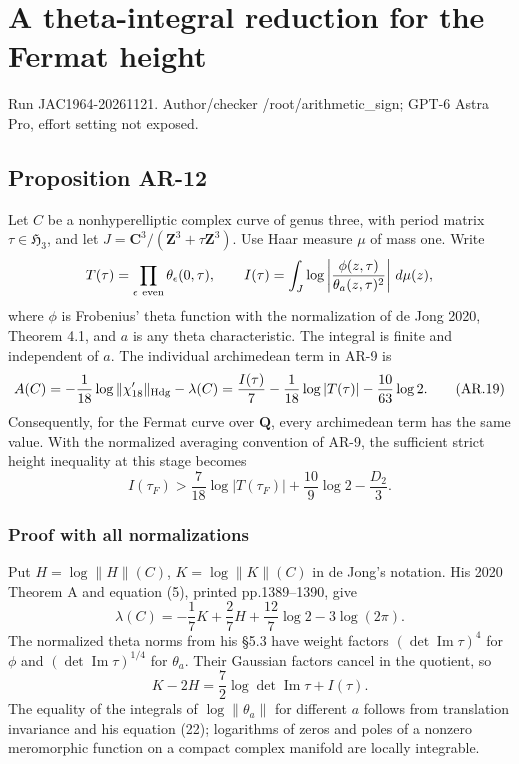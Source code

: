 \documentclass[11pt,a4paper]{article}
\begin{document}
\section{A theta-integral reduction for the Fermat
height}\label{a-theta-integral-reduction-for-the-fermat-height}

Run JAC1964-20261121. Author/checker /root/arithmetic\_sign; GPT-6 Astra
Pro, effort setting not exposed.

\subsection{Proposition AR-12}\label{proposition-ar-12}

Let \(C\) be a nonhyperelliptic complex curve of genus three, with
period matrix \(\tau\in\mathfrak H_3\), and let
\(J=\mathbf C^3/(\mathbf Z^3+\tau\mathbf Z^3)\). Use Haar measure
\(\mu\) of mass one. Write \[
T(\tau)=\prod_{\epsilon\ {\rm even}}\theta_\epsilon(0,\tau),
\qquad
I(\tau)=\int_J\log\left|
  \frac{\phi(z,\tau)}{\theta_a(z,\tau)^2}
\right|\,d\mu(z),
\] where \(\phi\) is Frobenius' theta function with the normalization of
de Jong 2020, Theorem 4.1, and \(a\) is any theta characteristic. The
integral is finite and independent of \(a\). The individual archimedean
term in AR-9 is \[
A(C)=-\frac1{18}\log\|\chi'_{18}\|_{\rm Hdg}-\lambda(C)
     =\frac{I(\tau)}7-\frac1{18}\log|T(\tau)|
        -\frac{10}{63}\log2.
\tag{AR.19}
\] Consequently, for the Fermat curve over \(\mathbf Q\), every
archimedean term has the same value. With the normalized averaging
convention of AR-9, the sufficient strict height inequality at this
stage becomes \[
I(\tau_F)>
\frac7{18}\log|T(\tau_F)|+\frac{10}{9}\log2-\frac{D_2}{3}.
\tag{AR.20}
\]

\subsubsection{Proof with all
normalizations}\label{proof-with-all-normalizations}

Put \(H=\log\|H\|(C)\), \(K=\log\|K\|(C)\) in de Jong's notation. His
2020 Theorem A and equation (5), printed pp.1389--1390, give \[
\lambda(C)=-\frac17K+\frac27H
                +\frac{12}{7}\log2-3\log(2\pi).
\] The normalized theta norms from his §5.3 have weight factors
\((\det\operatorname{Im}\tau)^4\) for \(\phi\) and
\((\det\operatorname{Im}\tau)^{1/4}\) for \(\theta_a\). Their Gaussian
factors cancel in the quotient, so \[
K-2H=\frac72\log\det\operatorname{Im}\tau+I(\tau).
\] The equality of the integrals of \(\log\|\theta_a\|\) for different
\(a\) follows from translation invariance and his equation (22);
logarithms of zeros and poles of a nonzero meromorphic function on a
compact complex manifold are locally integrable.
\end{document}
